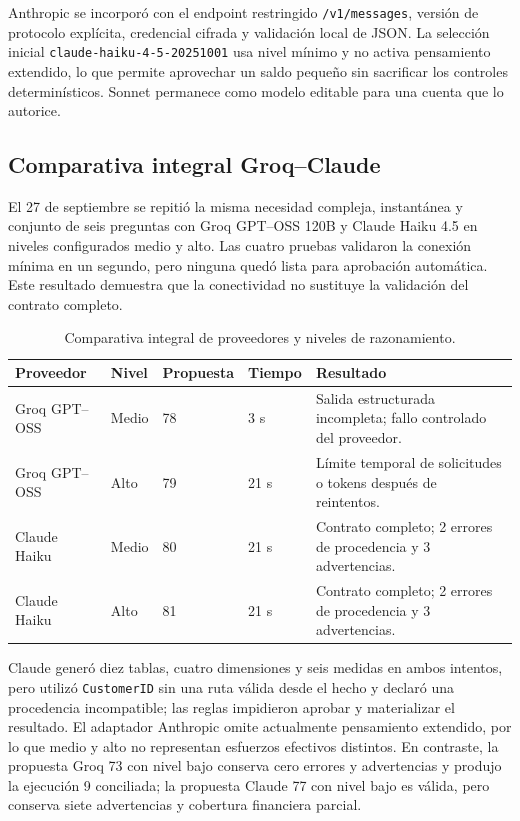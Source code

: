 \documentclass[11pt,letterpaper]{article}
\newcommand{\file}[1]{\texttt{#1}}
\begin{document}
Anthropic se incorporó con el endpoint restringido \file{/v1/messages}, versión de protocolo explícita, credencial cifrada y validación local de JSON. La selección inicial \file{claude-haiku-4-5-20251001} usa nivel mínimo y no activa pensamiento extendido, lo que permite aprovechar un saldo pequeño sin sacrificar los controles determinísticos. Sonnet permanece como modelo editable para una cuenta que lo autorice.

\subsection{Comparativa integral Groq--Claude}

El 27 de septiembre se repitió la misma necesidad compleja, instantánea y conjunto de seis preguntas con Groq GPT--OSS 120B y Claude Haiku 4.5 en niveles configurados medio y alto. Las cuatro pruebas validaron la conexión mínima en un segundo, pero ninguna quedó lista para aprobación automática. Este resultado demuestra que la conectividad no sustituye la validación del contrato completo.

\begin{table}[ht]
\centering
\caption{Comparativa integral de proveedores y niveles de razonamiento.}
\begin{tabularx}{\textwidth}{@{}p{}p{}p{}p{}X@{}}
  \toprule
  Proveedor & Nivel & Propuesta & Tiempo & Resultado \\
  \midrule
  Groq GPT--OSS & Medio & 78 & 3 s & Salida estructurada incompleta; fallo controlado del proveedor. \\
  Groq GPT--OSS & Alto & 79 & 21 s & Límite temporal de solicitudes o tokens después de reintentos. \\
  Claude Haiku & Medio & 80 & 21 s & Contrato completo; 2 errores de procedencia y 3 advertencias. \\
  Claude Haiku & Alto & 81 & 21 s & Contrato completo; 2 errores de procedencia y 3 advertencias. \\
  \bottomrule
\end{tabularx}
\end{table}

Claude generó diez tablas, cuatro dimensiones y seis medidas en ambos intentos, pero utilizó \file{CustomerID} sin una ruta válida desde el hecho y declaró una procedencia incompatible; las reglas impidieron aprobar y materializar el resultado. El adaptador Anthropic omite actualmente pensamiento extendido, por lo que medio y alto no representan esfuerzos efectivos distintos. En contraste, la propuesta Groq 73 con nivel bajo conserva cero errores y advertencias y produjo la ejecución 9 conciliada; la propuesta Claude 77 con nivel bajo es válida, pero conserva siete advertencias y cobertura financiera parcial.
\end{document}
